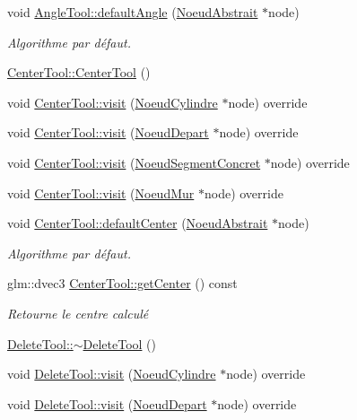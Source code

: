 \begin{DoxyCompactItemize}
void \hyperlink{group__inf2990_gac864ba35d8073ed9564a0a90d4df351d}{Angle\+Tool\+::default\+Angle} (\hyperlink{class_noeud_abstrait}{Noeud\+Abstrait} $\ast$node)
\begin{DoxyCompactList}\small\item\em Algorithme par défaut. \end{DoxyCompactList}\item 
\hyperlink{group__inf2990_ga3814d534b50e7dff7fbd7efef552685d}{Center\+Tool\+::\+Center\+Tool} ()
\item 
void \hyperlink{group__inf2990_ga9ceff880a444e12bc6b4dab4313c1809}{Center\+Tool\+::visit} (\hyperlink{class_noeud_cylindre}{Noeud\+Cylindre} $\ast$node) override
\item 
void \hyperlink{group__inf2990_ga8417547d629ccacfa218979e6ba6cdf5}{Center\+Tool\+::visit} (\hyperlink{class_noeud_depart}{Noeud\+Depart} $\ast$node) override
\item 
void \hyperlink{group__inf2990_gac441b1692c3b057050ced592ba372263}{Center\+Tool\+::visit} (\hyperlink{class_noeud_segment_concret}{Noeud\+Segment\+Concret} $\ast$node) override
\item 
void \hyperlink{group__inf2990_ga13d2bac067f4262be4fd60c302a07124}{Center\+Tool\+::visit} (\hyperlink{class_noeud_mur}{Noeud\+Mur} $\ast$node) override
\item 
void \hyperlink{group__inf2990_gab64cc9d2d491c0bd04a1efc4756740df}{Center\+Tool\+::default\+Center} (\hyperlink{class_noeud_abstrait}{Noeud\+Abstrait} $\ast$node)
\begin{DoxyCompactList}\small\item\em Algorithme par défaut. \end{DoxyCompactList}\item 
glm\+::dvec3 \hyperlink{group__inf2990_gaf086e5f530c5189f4b72563a4abfe35f}{Center\+Tool\+::get\+Center} () const 
\begin{DoxyCompactList}\small\item\em Retourne le centre calculé \end{DoxyCompactList}\item 
\hyperlink{group__inf2990_ga4a54f710ae3ca5e4eb8e16610d07c3bc}{Delete\+Tool\+::$\sim$\+Delete\+Tool} ()
\item 
void \hyperlink{group__inf2990_gaf91f134881ce52596486855f405e8f96}{Delete\+Tool\+::visit} (\hyperlink{class_noeud_cylindre}{Noeud\+Cylindre} $\ast$node) override
\item 
void \hyperlink{group__inf2990_ga9efc126da05a809724a3a2597ac4cb57}{Delete\+Tool\+::visit} (\hyperlink{class_noeud_depart}{Noeud\+Depart} $\ast$node) override

\end{DoxyCompactItemize}
